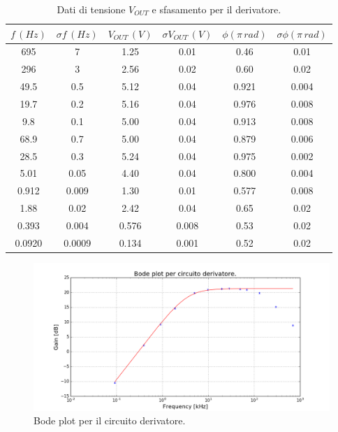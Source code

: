 \documentclass[10pt,a4paper]{article}
\begin{document}
\begin{table}[!htb]\centering
\begin{tabular}{|c|c|c|c|c|c|}
\hline$f \, (Hz)$ & $ \sigma f \, (Hz)$ & $V_{OUT} \, (V)$ & $\sigma V_{OUT} \, (V)$ & $\phi (\pi \, rad)$ & $\sigma \phi (\pi \, rad)$\\
\hline
695 & 7 & 1.25 & 0.01 & 0.46 & 0.01\\
296 & 3 & 2.56 & 0.02 & 0.60 & 0.02\\
49.5 & 0.5 & 5.12 & 0.04 & 0.921 & 0.004\\
19.7 & 0.2 & 5.16 & 0.04 & 0.976 & 0.008\\
9.8 & 0.1 & 5.00 & 0.04 & 0.913 & 0.008\\
68.9 & 0.7 & 5.00 & 0.04 & 0.879 & 0.006\\
28.5 & 0.3 & 5.24 & 0.04 & 0.975 & 0.002\\
5.01 & 0.05 & 4.40 & 0.04 & 0.800 & 0.004\\
0.912 & 0.009 & 1.30 & 0.01 & 0.577 & 0.008\\
1.88 & 0.02 & 2.42 & 0.04 & 0.65 & 0.02\\
0.393 & 0.004 & 0.576 & 0.008 & 0.53 & 0.02\\
0.0920 & 0.0009 & 0.134 & 0.001 & 0.52 & 0.02\\
\hline
\end{tabular}
\caption{Dati di tensione $V_{OUT}$ e sfasamento per il derivatore.}
\label{derivatore}
\end{table}

\begin{figure}[!htb]
\centering
  \includegraphics[scale=.6]{bodeDerivatore.png}
\caption{Bode plot per il circuito derivatore.}
\label{bodeDerivatore}
\end{figure}
\end{document}
